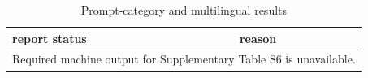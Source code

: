 \begin{table}[htbp]
\centering
\caption{Prompt-category and multilingual results}
\label{tab:s6}
\begin{tabular}{ll}
\hline
report status & reason \\
\hline
\multicolumn{2}{l}{Required machine output for Supplementary Table S6 is unavailable.} \\
\hline
\end{tabular}
\end{table}
